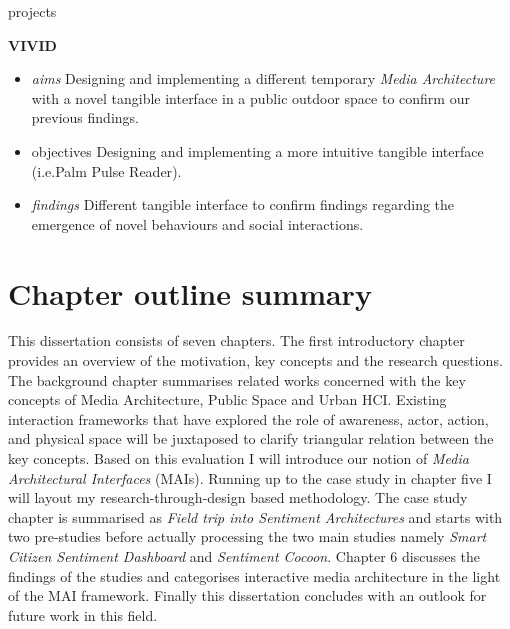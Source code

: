 \begin{singlespace}
{\begin{labeling}{projects}
\item [\textbf{VIVID}] 
\begin {itemize}
\footnotesize
\item [\textit{aims}] Designing and implementing a different temporary \textit{Media Architecture} with a novel tangible interface in a public outdoor space to confirm our previous findings.
\item [{objectives}] Designing and implementing a more intuitive tangible interface (i.e.{Palm Pulse Reader}).  
\item [\textit{findings}] Different tangible interface to confirm findings regarding the emergence of novel behaviours and social interactions. 
\end{itemize}

\end{labeling}
}
  
  \end{singlespace}


\section{Chapter outline summary}

This dissertation consists of seven chapters. The first introductory chapter provides an overview of the motivation, key concepts and the research questions. The background chapter summarises related works concerned with the key concepts of Media Architecture, Public Space and Urban HCI. Existing interaction frameworks that have explored the role of awareness, actor, action, and physical space will be juxtaposed to clarify triangular relation between the key concepts. Based on this evaluation I will introduce our notion of \textit{Media Architectural Interfaces} (MAIs). Running up to the case study in chapter five I will layout my research-through-design based methodology. The case study chapter is summarised as \textit{Field trip into Sentiment Architectures} and starts with two pre-studies before actually processing the two main studies namely \textit{Smart Citizen Sentiment Dashboard} and \textit{Sentiment Cocoon}. Chapter 6 discusses the findings of the studies and categorises interactive media architecture in the light of the MAI framework. Finally this dissertation concludes with an outlook for future work in this field.  


